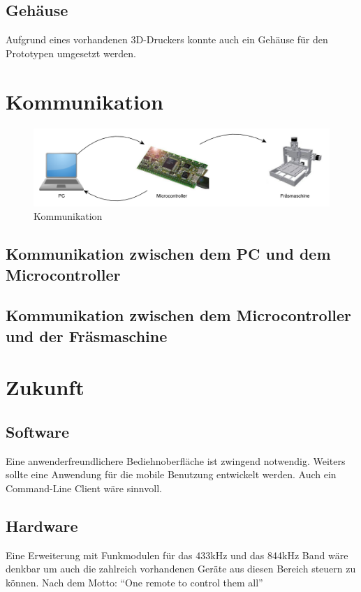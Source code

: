 \documentclass[11pt,a4paper,bibtotoc,oneside]{scrbook}
\begin{document}
\section{Gehäuse}
Aufgrund eines vorhandenen 3D-Druckers konnte auch ein Gehäuse für den Prototypen umgesetzt werden.

\chapter{Kommunikation}
\begin{figure}[!ht]
    \centering
        \includegraphics[width=360pt]{./picture/Kommunikation.pdf}
        \caption{\label{lm324}{Kommunikation}}
\end{figure}
\section{Kommunikation zwischen dem PC und dem Microcontroller}
\section{Kommunikation zwischen dem Microcontroller und der Fräsmaschine}

\chapter{Zukunft}

\section{Software}
Eine anwenderfreundlichere Bediehnoberfläche ist zwingend notwendig. Weiters sollte eine Anwendung für die
mobile Benutzung entwickelt werden. Auch ein Command-Line Client wäre sinnvoll.

\section{Hardware}
Eine Erweiterung mit Funkmodulen für das 433kHz und das 844kHz Band wäre denkbar um auch die zahlreich vorhandenen
Geräte aus diesen Bereich steuern zu können. Nach dem Motto: ``One remote to control them all''
\end{document}
